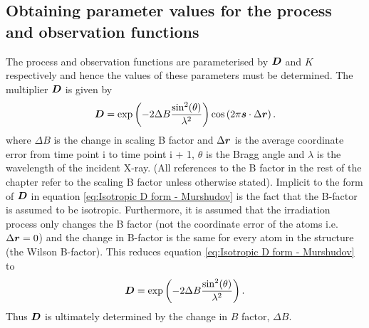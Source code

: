 \subsection{Obtaining parameter values for the process and observation functions}
\label{sub:Obtaining parameter values for the process and observation functions}
The process and observation functions are parameterised by $\boldsymbol{D}$ and $K$ respectively and hence the values of these parameters must be determined.
The multiplier $\boldsymbol{D}$ is given by \cite{murshudov1997refinement,leal2012}
\begin{equation}
    \boldsymbol{D} = \exp \left( -2\Delta B \frac{\sin^2(\theta)}{\lambda^2} \right) \cos \left( 2 \pi \boldsymbol{s} \cdot \Delta \boldsymbol{r} \right).
    \label{eq:Isotropic D form - Murshudov}
\end{equation}
where $\Delta B$ is the change in scaling B factor and $\Delta \boldsymbol{r}$ is the average coordinate error from time point i to time point i + 1, $\theta$ is the Bragg angle and $\lambda$ is the wavelength of the incident X-ray.
(All references to the B factor in the rest of the chapter refer to the scaling B factor unless otherwise stated).
Implicit to the form of $\boldsymbol{D}$ in equation \ref{eq:Isotropic D form - Murshudov} is the fact that the B-factor is assumed to be isotropic.
Furthermore, it is assumed that the irradiation process only changes the B factor (not the coordinate error of the atoms i.e. $\Delta \boldsymbol{r} = 0$) and the change in B-factor is the same for every atom in the structure (the Wilson B-factor).
This reduces equation \ref{eq:Isotropic D form - Murshudov} to
\begin{equation}
    \boldsymbol{D} = \exp \left( -2\Delta B \frac{\sin^2(\theta)}{\lambda^2} \right).
    \label{eq:Reduced D form}
\end{equation}
Thus $\boldsymbol{D}$ is ultimately determined by the change in $B$ factor, $\Delta B$.

